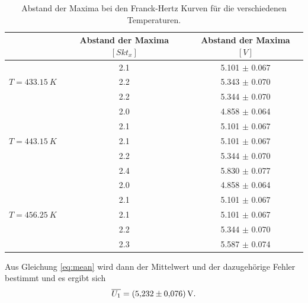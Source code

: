 \begin{table}[H]
  \begin{center}
    \label{tab:franck}
    \begin{tabular}{c|c|c}
       & \textbf{Abstand der Maxima $[Skt_x]$} & \textbf{Abstand der Maxima $[V]$}\\
      \hline
                                    & 2.1 & 5.101 $\pm$ 0.067 \\
      \textbf{$T = \SI{433.15}{K}$} & 2.2 & 5.343 $\pm$ 0.070 \\
                                    & 2.2 & 5.344 $\pm$ 0.070 \\
      \hline
                                    & 2.0 & 4.858 $\pm$ 0.064 \\
                                    & 2.1 & 5.101 $\pm$ 0.067 \\
      \textbf{$T = \SI{443.15}{K}$} & 2.1 & 5.101 $\pm$ 0.067 \\
                                    & 2.2 & 5.344 $\pm$ 0.070 \\
                                    & 2.4 & 5.830 $\pm$ 0.077 \\
      \hline
                                    & 2.0 & 4.858 $\pm$ 0.064 \\
                                    & 2.1 & 5.101 $\pm$ 0.067 \\
      \textbf{$T = \SI{456.25}{K}$} & 2.1 & 5.101 $\pm$ 0.067 \\
                                    & 2.2 & 5.344 $\pm$ 0.070 \\
                                    & 2.3 & 5.587 $\pm$ 0.074
    \end{tabular}
    \caption{Abstand der Maxima bei den Franck-Hertz Kurven für die verschiedenen Temperaturen.}
  \end{center}
\end{table}

Aus Gleichung \ref{eq:mean} wird dann der Mittelwert und der dazugehörige Fehler bestimmt und es ergibt sich
\begin{equation}
  \overline{U_1} = \SI{5.232 \pm 0.076}{V}. \notag
\end{equation}


